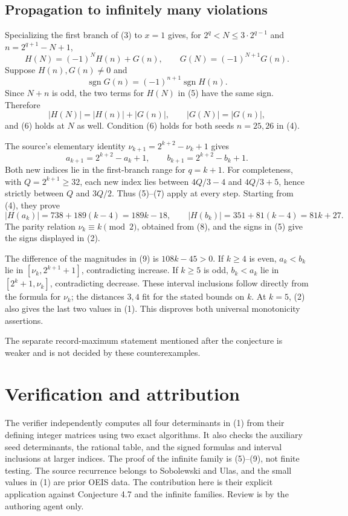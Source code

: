 \documentclass[11pt]{article}
\begin{document}
\subsection*{Propagation to infinitely many violations}
Specializing the first branch of (3) to $x=1$ gives, for
$2^q<N\le3\cdot2^{q-1}$ and $n=2^{q+1}-N+1$,
\[
 H(N)=(-1)^NH(n)+G(n),\qquad
 G(N)=(-1)^{N+1}G(n).                                        \tag{5}
\]
Suppose $H(n),G(n)\ne0$ and
\[
 \operatorname{sgn}G(n)=(-1)^{n+1}\operatorname{sgn}H(n).        \tag{6}
\]
Since $N+n$ is odd, the two terms for $H(N)$ in (5) have the
same sign. Therefore
\[
 |H(N)|=|H(n)|+|G(n)|,\qquad |G(N)|=|G(n)|,                   \tag{7}
\]
and (6) holds at $N$ as well. Condition (6) holds for both seeds
$n=25,26$ in (4).

The source's elementary identity
$\nu_{k+1}=2^{k+2}-\nu_k+1$ gives
\[
 a_{k+1}=2^{k+2}-a_k+1,\qquad
 b_{k+1}=2^{k+2}-b_k+1.                                     \tag{8}
\]
Both new indices lie in the first-branch range for $q=k+1$.
For completeness, with $Q=2^{k+1}\ge32$, each new index lies
between $4Q/3-4$ and $4Q/3+5$, hence strictly between $Q$ and
$3Q/2$. Thus (5)--(7) apply at every step.
Starting from (4), they prove
\[
 |H(a_k)|=738+189(k-4)=189k-18,\qquad
 |H(b_k)|=351+81(k-4)=81k+27.                                \tag{9}
\]
The parity relation $\nu_k\equiv k\pmod2$, obtained from (8),
and the signs in (5) give the signs displayed in (2).

The difference of the magnitudes in (9) is $108k-45>0$.
If $k\ge4$ is even, $a_k<b_k$ lie in
$[\nu_k,2^{k+1}+1]$, contradicting increase. If $k\ge5$ is
odd, $b_k<a_k$ lie in $[2^k+1,\nu_k]$, contradicting decrease.
These interval inclusions follow directly from the formula for
$\nu_k$; the distances $3,4$ fit for the stated bounds on $k$.
At $k=5$, (2) also gives the last two values in (1).
This disproves both universal monotonicity assertions.

The separate record-maximum statement mentioned after the conjecture
is weaker and is not decided by these counterexamples.

\section*{Verification and attribution}
The verifier independently computes all four determinants in (1)
from their defining integer matrices using two exact algorithms.
It also checks the auxiliary seed determinants, the rational table,
and the signed formulas and interval inclusions at larger indices.
The proof of the infinite family is (5)--(9), not finite testing.
The source recurrence belongs to Sobolewski and Ulas, and the small
values in (1) are prior OEIS data. The contribution here is their
explicit application against Conjecture 4.7 and the infinite families.
Review is by the authoring agent only.
\end{document}
